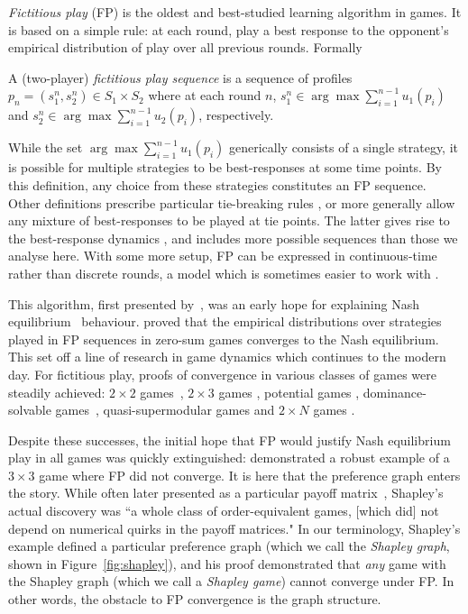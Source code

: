 \documentclass[preprint,authoryear]{elsarticle}
\begin{document}
\emph{Fictitious play} (FP) is the oldest and best-studied learning algorithm in games. It is based on a simple rule: at each round, play a best response to the opponent's empirical distribution of play over all previous rounds. Formally
\begin{defn}
    A (two-player) \emph{fictitious play sequence} is a sequence of profiles $p_n = (s_1^n, s_2^n) \in S_1\times S_2$ where at each round $n$, $s_1^n \in \arg\max \sum_{i=1}^{n-1} u_1(p_i)$ and $s_2^n \in \arg\max\sum_{i=1}^{n-1} u_2(p_i)$, respectively.
\end{defn}
While the set $\arg\max \sum_{i=1}^{n-1} u_1(p_i)$ generically consists of a single strategy, it is possible for multiple strategies to be best-responses at some time points. By this definition, any choice from these strategies constitutes an FP sequence. Other definitions prescribe particular tie-breaking rules \cite{miyasawa1961convergence,krishna1992learning}, or more generally allow any mixture of best-responses to be played at tie points. The latter gives rise to the best-response dynamics \citep{hofbauer_evolutionary_2003}, and includes more possible sequences than those we analyse here. With some more setup, FP can be expressed in continuous-time rather than discrete rounds, a model which is sometimes easier to work with \citep{krishna_convergence_1998,berger_fictitious_2005,berger_two_2007}.

This algorithm, first presented by~\cite{brown1949some}, was an early hope for explaining Nash equilibrium~\citep{nash_non-cooperative_1951} behaviour. \citeauthor{robinson_iterative_1951} proved that the empirical distributions over strategies played in FP sequences in zero-sum games converges to the Nash equilibrium. This set off a line of research in game dynamics which continues to the modern day. For fictitious play, proofs of convergence in various classes of games were steadily achieved: $2\times 2$ games~\citep{miyasawa1961convergence}, $2\times 3$ games \citep{monderer_fictitious_1997}, potential games \citep{monderer_potential_1996}, dominance-solvable games~\cite{milgrom_adaptive_1991}, quasi-supermodular games \citep{milgrom_rationalizability_1990} and $2\times N$ games \citep{berger_fictitious_2005}.

Despite these successes, the initial hope that FP would justify Nash equilibrium play in all games was quickly extinguished: \cite{shapley_topics_1964} demonstrated a robust example of a $3\times 3$ game where FP did not converge. It is here that the preference graph enters the story. While often later presented as a particular payoff matrix~\citep{krishna_convergence_1998,jordan_three_1993,gaunersdorfer_fictitious_1995}, Shapley's actual discovery was ``a whole class of order-equivalent games, [which did] not depend on numerical quirks in the payoff matrices." In our terminology, Shapley's example defined a particular preference graph (which we call the \emph{Shapley graph}, shown in Figure~\ref{fig:shapley}), and his proof demonstrated that \emph{any} game with the Shapley graph (which we call a \emph{Shapley game}) cannot converge under FP. In other words, the obstacle to FP convergence is the graph structure.
\end{document}
